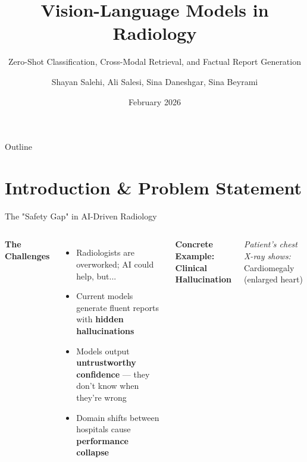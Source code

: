 \documentclass[aspectratio=169]{beamer}
\title[Radiology VLMs]{Vision-Language Models in Radiology}
\subtitle{Zero-Shot Classification, Cross-Modal Retrieval, and Factual Report Generation}
\author[Salehi, Salesi, Daneshgar, Beyrami]{Shayan Salehi, Ali Salesi, Sina Daneshgar, Sina Beyrami}
\institute[SUT]{
  Department of Computer Engineering\\
  Sharif University of Technology
}
\date{February 2026}
\begin{document}
\begin{frame}
  \titlepage
\end{frame}

\begin{frame}{Outline}
  \tableofcontents
\end{frame}

\section{Introduction \& Problem Statement}

\begin{frame}{The "Safety Gap" in AI-Driven Radiology}
  
  \begin{columns}
    \textbf{The Challenges}
    \begin{itemize}
      \item Radiologists are overworked; AI could help, but...
      \item Current models generate fluent reports with \textcolor{alertred}{\textbf{hidden hallucinations}}
      \item Models output \textcolor{alertred}{\textbf{untrustworthy confidence}} — they don't know when they're wrong
      \item Domain shifts between hospitals cause \textcolor{alertred}{\textbf{performance collapse}}
    \end{itemize}
    
    \textbf{Concrete Example: Clinical Hallucination}
    
    \vspace{0.3cm}
    \textit{Patient's chest X-ray shows:} Cardiomegaly (enlarged heart)
    
    \vspace{0.2cm}
    \small
    
    \vspace{0.2cm}
  \end{columns}
  
\end{frame}
\end{document}
